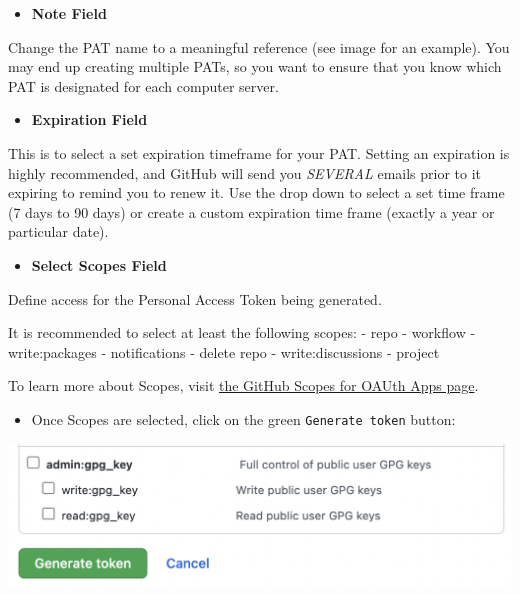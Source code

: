 \documentclass[
]{book}
\providecommand{\tightlist}{%
  \setlength{\itemsep}{0pt}\setlength{\parskip}{0pt}}
\begin{document}
\begin{itemize}
\tightlist
\item
  \textbf{Note Field}
\end{itemize}

Change the PAT name to a meaningful reference (see image for an example). You may end up creating multiple PATs, so you want to ensure that you know which PAT is designated for each computer \textbar{} server.

\begin{itemize}
\tightlist
\item
  \textbf{Expiration Field}
\end{itemize}

This is to select a set expiration timeframe for your PAT. Setting an expiration is highly recommended, and GitHub will send you \emph{SEVERAL} emails prior to it expiring to remind you to renew it. Use the drop down to select a set time frame (7 days to 90 days) or create a custom expiration time frame (exactly a year or particular date).

\begin{itemize}
\tightlist
\item
  \textbf{Select Scopes Field}
\end{itemize}

Define access for the Personal Access Token being generated.

It is recommended to select at least the following scopes:
- repo
- workflow
- write:packages
- notifications
- delete repo
- write:discussions
- project

To learn more about Scopes, visit \href{https://docs.github.com/en/developers/apps/building-oauth-apps/scopes-for-oauth-apps}{the GitHub Scopes for OAUth Apps page}.

\begin{itemize}
\tightlist
\item
  Once Scopes are selected, click on the green \texttt{Generate\ token} button:
\end{itemize}

\begin{center}\includegraphics[width=0.8\linewidth]{images/generatepat} \end{center}
\end{document}
